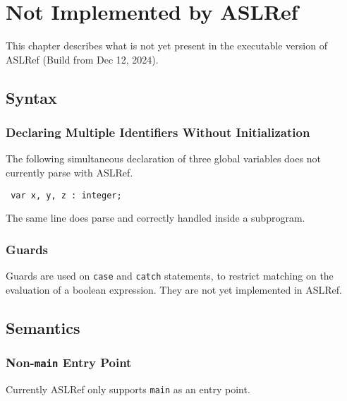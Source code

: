 \chapter{Not Implemented by ASLRef\label{appendix:UnimplementedInASLRef}}

This chapter describes what is not yet present in the executable version of ASLRef
(Build from Dec 12, 2024).

\section{Syntax}

\subsection{Declaring Multiple Identifiers Without Initialization}
The following simultaneous declaration of three global variables does not currently parse with ASLRef.
\begin{verbatim}
 var x, y, z : integer;
\end{verbatim}

The same line does parse and correctly handled inside a subprogram.


\subsection{Guards}

Guards are used on \texttt{case} and \texttt{catch} statements, to restrict
matching on the evaluation of a boolean expression.
%
They are not yet implemented in ASLRef.


\section{Semantics}

\subsection{Non-\texttt{main} Entry Point}
Currently ASLRef only supports \texttt{main} as an entry point.

